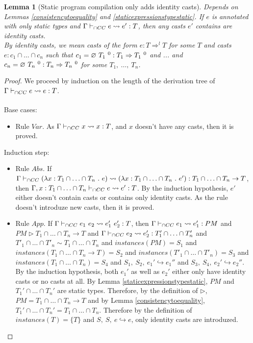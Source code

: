\documentclass[a4paper]{article}
\newtheorem{lemma}{Lemma}
\begin{document}
\begin{lemma}[Static program compilation only adds identity casts]
\label{staticcompilation}
Depends on Lemmas \ref{consistencytoequality} and \ref{staticexpressionstypestatic}.
If $e$ is annotated with only static types and $\Gamma \vdash_{\cap CC} e \leadsto e' : T$, then any casts $e'$ contains are identity casts.\\
By identity casts, we mean casts of the form $e : T \Rightarrow^l T$ for some $T$ and casts $e : c_1 \cap \ldots \cap c_n$ such that $c_1 = \varnothing\ T_1\ ^{0} : T_1 \Rightarrow T_1\ ^{0}$ and ... and $c_n = \varnothing\ T_n\ ^{0} : T_n \Rightarrow T_n\ ^{0}$ for some $T_1,\ \ldots,\ T_n$.
\end{lemma}
\begin{proof}
We proceed by induction on the length of the derivation tree of $\Gamma \vdash_{\cap CC} e \leadsto e : T$.\\\\
Base cases:
\begin{itemize}
    \item Rule $Var$.
    As $\Gamma \vdash_{\cap CC} x \leadsto x : T$, and $x$ doesn't have any casts, then it is proved.
\end{itemize}
Induction step:
\begin{itemize}
    \item Rule $Abs$.
    If $\Gamma \vdash_{\cap CC} (\lambda x : T_1 \cap \ldots \cap T_n\ .\ e) \leadsto (\lambda x : T_1 \cap \ldots \cap T_n\ .\ e') : T_1 \cap \ldots \cap T_n \rightarrow T$, then $\Gamma, x : T_1 \cap \ldots \cap T_n \vdash_{\cap CC} e \leadsto e' : T$.
    By the induction hypothesis, $e'$ either doesn't contain casts or contains only identity casts.
    As the rule doesn't introduze new casts, then it is proved.
    \item Rule $App$.
    If $\Gamma \iccts e_1\ e_2 \leadsto e_1'\ e_2': T$, then $\Gamma \vdash_{\cap CC} e_1 \leadsto e_1' : PM$ and $PM \rhd T_1 \cap \ldots \cap T_n \rightarrow T$ and $\Gamma \vdash_{\cap CC} e_2 \leadsto e_2' : T'_1 \cap \ldots \cap T'_n$ and $T'_1 \cap \ldots \cap T'_n \sim T_1 \cap \ldots \cap T_n$ and $instances(PM) = S_1$ and $instances(T_1 \cap \ldots \cap T_n \rightarrow T) = S_2$ and $instances(T'_1 \cap \ldots \cap T'_n) = S_3$ and $instances(T_1 \cap \ldots \cap T_n) = S_4$ and $S_1,\ S_2,\ e_1' \hookrightarrow e_1''$ and $S_3,\ S_4,\ e_2' \hookrightarrow e_2''$.
    By the induction hypothesis, both $e_1'$ as well as $e_2'$ either only have identity casts or no casts at all.
    By Lemma \ref{staticexpressionstypestatic}, $PM$ and $T_1' \cap \ldots \cap T_n'$ are static types.
    Therefore, by the definition of $\rhd$, $PM = T_1 \cap \ldots \cap T_n \rightarrow T$ and by Lemma \ref{consistencytoequality}, $T_1' \cap \ldots \cap T_n' = T_1 \cap \ldots \cap T_n$.
    Therefore by the definition of $instances(T) = \{T\}$ and $S,\ S,\ e \hookrightarrow e$, only identity casts are introduzed.
\end{itemize}
\end{proof}
\end{document}
